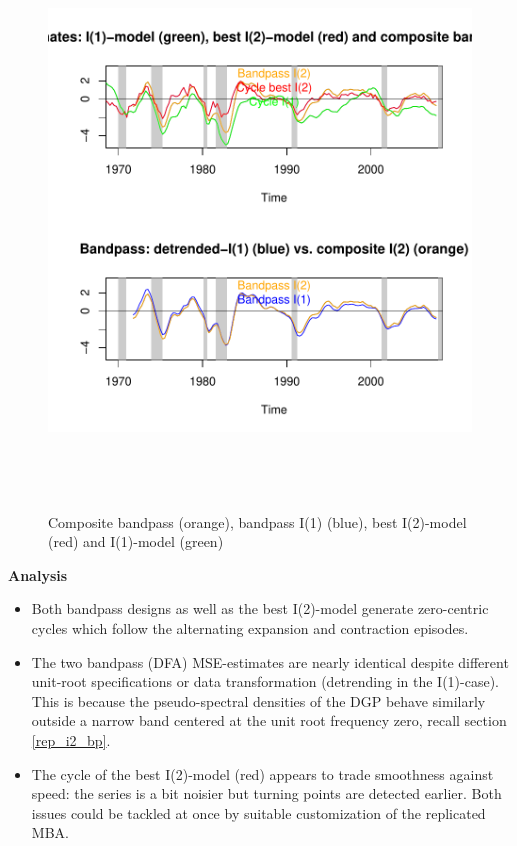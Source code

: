 \documentclass[a4paper]{book}
\begin{document}
\begin{enumerate}
\begin{figure}[H]\begin{center}\includegraphics[height=6in, width=6in]{z_us_real_log_gdp_detrended_filt_bp_i2}\caption{Composite bandpass (orange), bandpass I(1) (blue), best I(2)-model (red) and I(1)-model (green)   \label{z_us_real_log_gdp_detrended_filt_bp_i2}}\end{center}\end{figure}\end{enumerate}
\textbf{Analysis}
\begin{itemize}
\item Both bandpass designs as well as the best I(2)-model generate zero-centric cycles which follow the alternating expansion and contraction episodes. 
\item The two bandpass (DFA) MSE-estimates are nearly identical despite different unit-root specifications or data transformation (detrending in the I(1)-case). This is because the pseudo-spectral densities of the DGP behave similarly outside a narrow band centered at the unit root frequency zero, recall section \ref{rep_i2_bp}.
\item The cycle of the best I(2)-model (red) appears to trade smoothness against speed: the series is a bit noisier but turning points  are detected earlier. Both issues could be tackled at once by suitable customization of the replicated MBA.
\end{itemize}
\end{document}
